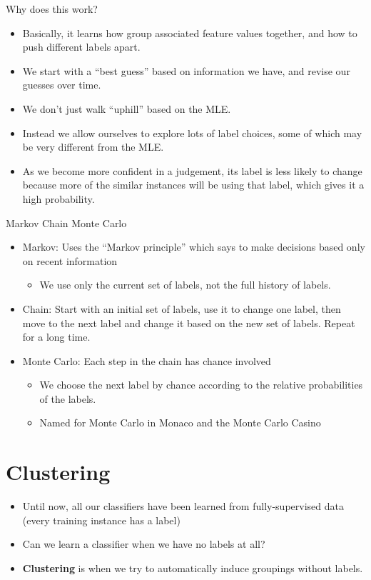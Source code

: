 \documentclass[11pt,letterpaper]{article}
\begin{document}
Why does this work?

\begin{itemize}
  \item Basically, it learns how group associated feature values together, and how to push different labels apart.
  \item We start with a ``best guess'' based on information we have, and revise our guesses over time.
  \item We don't just walk ``uphill'' based on the MLE.  
  \item Instead we allow ourselves to explore lots of label choices, some of which may be very different from the MLE.
  \item As we become more confident in a judgement, its label is less likely to change because more of the similar instances will be using that label, which gives it a high probability.
\end{itemize}

Markov Chain Monte Carlo

\begin{itemize}
  \item Markov: Uses the ``Markov principle'' which says to make decisions based only on recent information
    \begin{itemize}
      \item We use only the current set of labels, not the full history of labels.
    \end{itemize}
  \item Chain: Start with an initial set of labels, use it to change one label, then move to the next label and change it based on the new set of labels.  Repeat for a long time.
  \item Monte Carlo: Each step in the chain has chance involved
    \begin{itemize}
      \item We choose the next label by chance according to the relative probabilities of the labels.
      \item Named for Monte Carlo in Monaco and the Monte Carlo Casino
    \end{itemize}
\end{itemize}



\section{Clustering}

\begin{itemize}
  \item Until now, all our classifiers have been learned from fully-supervised data (every training instance has a label)
  \item Can we learn a classifier when we have no labels at all?
  \item \textbf{Clustering} is when we try to automatically induce groupings without labels.
\end{itemize}
\end{document}
